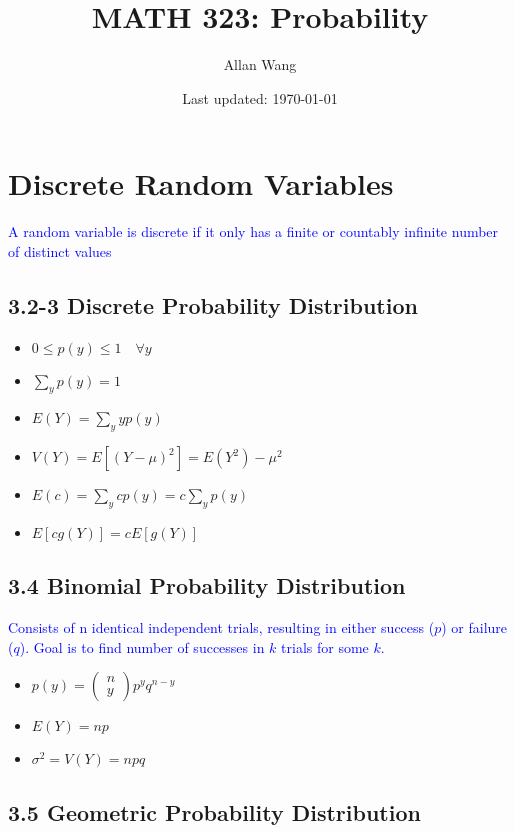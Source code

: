 \documentclass[12pt]{article}
\author{Allan Wang}
\date{Last updated: \today}
\title{MATH 323: Probability}
\newcommand\mm[1]{\begin{pmatrix}#1\end{pmatrix}}
\newcommand{\ddef}[1]{\textcolor{blue}{#1}}
\newcommand{\bbb}[1]{\left[#1\right]}
\begin{document}
\onehalfspacing
\maketitle
\tableofcontents
\pagebreak

\section{Discrete Random Variables}


\ddef{A random variable is discrete if it only has a finite or countably infinite number of distinct values}

\subsection{3.2-3 Discrete Probability Distribution}

\begin{itemize}
	\item $0 \le p(y) \le 1 \quad \forall y$
	\item $\sum_y p(y) = 1$
	\item $E(Y) = \sum_y yp(y)$
	\item $V(Y) = E\bbb{(Y - \mu)^2} = E(Y^2) - \mu^2$
	\item $E(c) = \sum_y c p(y) = c \sum_y p(y)$
	\item $E\bbb{cg(Y)} = cE\bbb{g(Y)}$
\end{itemize}

\subsection{3.4 Binomial Probability Distribution}

\ddef{Consists of n identical independent trials, resulting in either success ($p$) or failure ($q$). Goal is to find number of successes in $k$ trials for some $k$.}

\begin{itemize}
	\item $p(y) = \mm{n \\ y} p^y q^{n - y}$
	\item $E(Y) = np$
	\item $\sigma^2 = V(Y) = npq$
\end{itemize}

\subsection{3.5 Geometric Probability Distribution}
\end{document}

